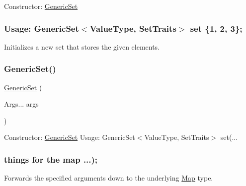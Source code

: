 Constructor\+: \mbox{\hyperlink{classstanfordcpplib_1_1collections_1_1GenericSet}{Generic\+Set}} \subsubsection*{Usage\+: Generic\+Set$<$\+Value\+Type, Set\+Traits$>$ set \{1, 2, 3\}; }

Initializes a new set that stores the given elements. 

\mbox{\label{classstanfordcpplib_1_1collections_1_1GenericSet_abcd375e42dcb08298b04d3425d2b95d7}} 
\subsubsection{\texorpdfstring{Generic\+Set()}{GenericSet()}\hspace{0.1cm}{\footnotesize\ttfamily [3/4]}}
{\footnotesize\ttfamily \mbox{\hyperlink{classstanfordcpplib_1_1collections_1_1GenericSet}{Generic\+Set}} (\begin{DoxyParamCaption}\item[{Args...}]{args }\end{DoxyParamCaption})\hspace{0.3cm}{\ttfamily [explicit]}}



Constructor\+: \mbox{\hyperlink{classstanfordcpplib_1_1collections_1_1GenericSet}{Generic\+Set}} Usage\+: Generic\+Set$<$\+Value\+Type, Set\+Traits$>$ set(... 

\subsubsection*{things for the map ...); }

Forwards the specified arguments down to the underlying \mbox{\hyperlink{classMap}{Map}} type. \mbox{\label{classstanfordcpplib_1_1collections_1_1GenericSet_aae5f987c2f3dc9708bed63dd9c80b5fa}} 
